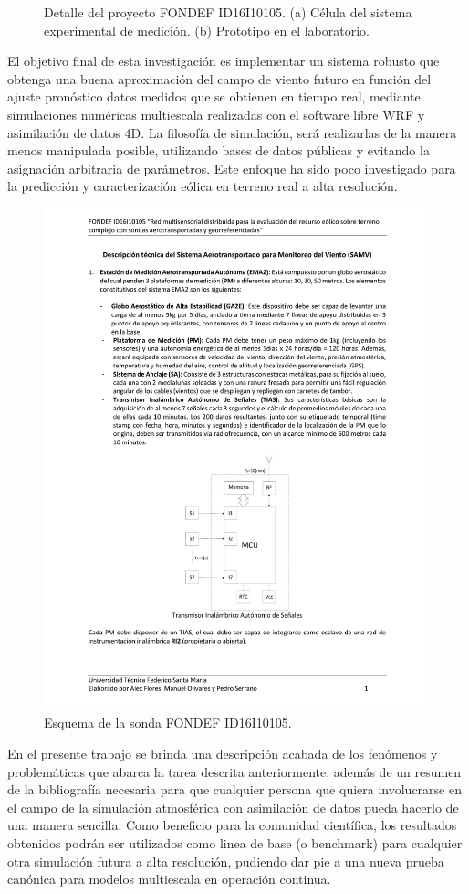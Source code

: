 \begin{figure}
\begin{minipage}{0.5\linewidth}
	\end{minipage}
	\caption{Detalle del proyecto FONDEF ID16I10105. (a) Célula del sistema experimental de medición. (b) Prototipo en el laboratorio.}
	\label{fig:01_detalle_fondef}
\end{figure}

El objetivo final de esta investigación es implementar un sistema robusto que obtenga una buena aproximación del campo de viento futuro en función del ajuste pronóstico  datos medidos que se obtienen en tiempo real, mediante simulaciones numéricas multiescala realizadas con el software libre WRF y asimilación de datos 4D. La filosofía de simulación, será realizarlas de la manera menos manipulada posible, utilizando bases de datos públicas y evitando la asignación arbitraria de parámetros. Este enfoque ha sido poco investigado para la predicción y caracterización eólica en terreno real a alta resolución. 

\begin{figure}[h!]
	\centering
	\includegraphics[width=0.82\linewidth,page=5,trim={3cm 2cm 2.3cm 3cm},clip]{Imagenes/01/descrp}
	\caption{Esquema de la sonda FONDEF ID16I10105.}
	\label{fig:01_sonda}
\end{figure}

En el presente trabajo se brinda una descripción acabada de los fenómenos y problemáticas que abarca la tarea descrita anteriormente, además de un resumen de la bibliografía necesaria para que cualquier persona que quiera involucrarse en el campo de la simulación atmosférica con asimilación de datos pueda hacerlo de una manera sencilla. Como beneficio para la comunidad científica, los resultados obtenidos podrán ser utilizados como linea de base (o benchmark) para cualquier otra simulación futura a alta resolución, pudiendo dar pie a una nueva prueba canónica para modelos multiescala en operación continua.

